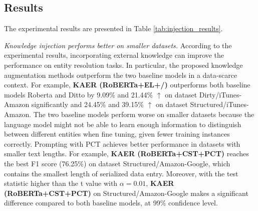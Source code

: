 \subsection{Results}
The experimental results are presented in Table \ref{tab:injection_results}.

\textit{Knowledge injection performs better on smaller datasets.}
According to the experimental results, incorporating external knowledge can improve the performance on entity resolution tasks. In particular, the proposed knowledge augmentation methods outperform the two baseline models in a data-scarce context.
For example, \textbf{KAER (RoBERTa+EL+/)} outperforms both baseline models Roberta and Ditto by 9.09\% and 21.44\% $\uparrow$ on dataset Dirty/iTunes-Amazon significantly and 24.45\% and 39.15\% $\uparrow$ on dataset Structured/iTunes-Amazon. The two baseline models perform worse on smaller datasets because the language model might not be able to learn enough information to distinguish between different entities when fine tuning, given fewer training instances correctly. 
Prompting with PCT achieves better performance in datasets with smaller text lengths. For example, \textbf{KAER (RoBERTa+CST+PCT)} reaches the best F1 score (76.25\%) on dataset Structured/Amazon-Google, which contains the smallest length of serialized data entry. Moreover, with the test statistic higher than the t value with $\alpha=0.01$, \textbf{KAER (RoBERTa+CST+PCT)} on Structured/Amazon-Google makes a significant difference compared to both baseline models, at 99\% confidence level.

